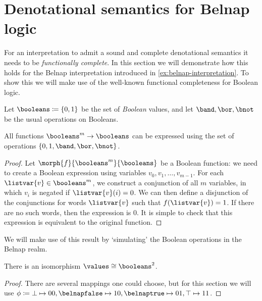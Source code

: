 \section{Denotational semantics for Belnap logic}\label{sec:denotational-belnap}

For an interpretation to admit a sound and complete denotational semantics it
needs to be \emph{functionally complete}.
In this section we will demonstrate how this holds for the Belnap interpretation
introduced in \cref{ex:belnap-interpretation}.
To show this we will make use of the well-known functional completeness for
Boolean logic.

\begin{definition}
    Let \(\booleans \coloneqq \{0, 1\}\) be the set of \emph{Boolean} values,
    and let \(\band,\bor,\bnot\) be the usual operations on Booleans.
\end{definition}

\begin{lemma}\label{lem:boolean-complete}
    All functions \(\booleans^{m} \to \booleans\) can be expressed using
    the set of operations \(\{0, 1, \band,\bor,\bnot\}\).
\end{lemma}
\begin{proof}
    Let \(\morph{f}{\booleans^{m}}{\booleans}\) be a Boolean function: we need
    to create a Boolean expression using variables \(v_0, v_1, \dots, v_{m-1}\).
    For each \(\listvar{v} \in \booleans^m\), we construct a conjunction of
    all \(m\) variables, in which \(v_i\) is negated if \(\listvar{v}(i) = 0\).
    We can then define a disjunction of the conjunctions for words
    \(\listvar{v}\) such that \(f(\listvar{v}) = 1\).
    If there are no such words, then the expression is \(0\).
    It is simple to check that this expression is equivalent to the original
    function.
\end{proof}

We will make use of this result by `simulating' the Boolean operations in the
Belnap realm.

\begin{lemma}
    There is an isomorphism \(\values \cong \booleans^2\).
\end{lemma}
\begin{proof}
    There are several mappings one could choose, but for this
    section we will use \(\phi \coloneqq
    \bot \mapsto 00, \belnapfalse \mapsto 10,
    \belnaptrue \mapsto 01, \top \mapsto 11
    \).
\end{proof}

